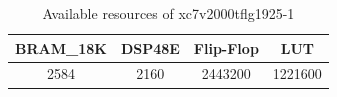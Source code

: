 \documentclass[conference]{IEEEtran}
\begin{document}
%

\begin{table}[htb]
\caption{Available resources of xc7v2000tflg1925-1}\label{table_available_resources}
\begin{tabular}{|c|c|c|c|}
\hline
BRAM\_18K & DSP48E & Flip-Flop & LUT\tabularnewline
\hline
\hline
2584 & 2160 & 2443200 & 1221600\tabularnewline
\hline
\end{tabular}
\end{table}


%
\end{document}
